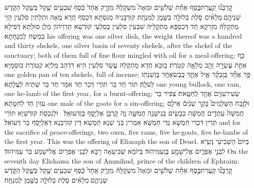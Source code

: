 {קׇרְבָּנ֞וֹ קַֽעֲרַת\maqqaf כֶּ֣סֶף אַחַ֗ת שְׁלֹשִׁ֣ים וּמֵאָה֮ מִשְׁקָלָהּ֒ מִזְרָ֤ק אֶחָד֙ כֶּ֔סֶף שִׁבְעִ֥ים שֶׁ֖קֶל בְּשֶׁ֣קֶל הַקֹּ֑דֶשׁ שְׁנֵיהֶ֣ם \legarmeh  מְלֵאִ֗ים סֹ֛לֶת בְּלוּלָ֥ה בַשֶּׁ֖מֶן לְמִנְחָֽה׃}
{קוּרְבָּנֵיהּ מְגִסְּתָא דִּכְסַף חֲדָא מְאָה וּתְלָתִין סִלְעִין הָוֵי מַתְקָלַהּ מִזְרְקָא חַד דְּכַסְפָּא מַתְקָלֵיהּ שִׁבְעִין סִלְעִין בְּסִלְעֵי קוּדְשָׁא תַּרְוֵיהוֹן מְלַן סוּלְתָּא דְּפִילָא בִמְשַׁח לְמִנְחָתָא׃}
{his offering was one silver dish, the weight thereof was a hundred and thirty shekels, one silver basin of seventy shekels, after the shekel of the sanctuary; both of them full of fine flour mingled with oil for a meal-offering;}{}
{כַּ֥ף אַחַ֛ת עֲשָׂרָ֥ה זָהָ֖ב מְלֵאָ֥ה קְטֹֽרֶת׃}
{בָּזִכָּא חֲדָא מַתְקָלַהּ עֲשַׂר סִלְעִין הִיא דִּדְהַב מַלְיָא קְטוֹרֶת בּוּסְמַיָּא׃}
{one golden pan of ten shekels, full of incense;}{}
{פַּ֣ר אֶחָ֞ד בֶּן\maqqaf בָּקָ֗ר אַ֧יִל אֶחָ֛ד כֶּֽבֶשׂ\maqqaf אֶחָ֥ד בֶּן\maqqaf שְׁנָת֖וֹ לְעֹלָֽה׃}
{תּוֹר חַד בַּר תּוֹרֵי דְּכַר חַד אִמַּר חַד בַּר שַׁתֵּיהּ לַעֲלָתָא׃}
{one young bullock, one ram, one he-lamb of the first year, for a burnt-offering;}{}
{שְׂעִיר\maqqaf עִזִּ֥ים אֶחָ֖ד לְחַטָּֽאת׃}
{צְפִיר בַּר עִזִּין חַד לְחַטָּתָא׃}
{one male of the goats for a sin-offering;}{}
{וּלְזֶ֣בַח הַשְּׁלָמִים֮ בָּקָ֣ר שְׁנַ֒יִם֒ אֵילִ֤ם חֲמִשָּׁה֙ עַתֻּדִ֣ים חֲמִשָּׁ֔ה כְּבָשִׂ֥ים בְּנֵי\maqqaf שָׁנָ֖ה חֲמִשָּׁ֑ה זֶ֛ה קׇרְבַּ֥ן אֶלְיָסָ֖ף בֶּן\maqqaf דְּעוּאֵֽל׃ \petucha }
{וּלְנִכְסַת קוּדְשַׁיָּא תּוֹרֵי תְּרֵין דִּכְרֵי חַמְשָׁא גְּדֵי חַמְשָׁא אִמְּרִין בְּנֵי שְׁנָא חַמְשָׁא דֵּין קוּרְבָּנָא דְּאֶלְיָסָף בַּר דְּעוּאֵל׃}
{and for the sacrifice of peace-offerings, two oxen, five rams, five he-goats, five he-lambs of the first year. This was the offering of Eliasaph the son of Deuel.}{}
{בַּיּוֹם֙ הַשְּׁבִיעִ֔י נָשִׂ֖יא לִבְנֵ֣י אֶפְרָ֑יִם אֱלִֽישָׁמָ֖ע בֶּן\maqqaf עַמִּיהֽוּד׃}
{בְּיוֹמָא שְׁבִיעָאָה רַבָּא לִבְנֵי אֶפְרָיִם אֱלִישָׁמָע בַּר עַמִּיהוּד׃}
{On the seventh day Elishama the son of Ammihud, prince of the children of Ephraim:}{}
{קׇרְבָּנ֞וֹ קַֽעֲרַת\maqqaf כֶּ֣סֶף אַחַ֗ת שְׁלֹשִׁ֣ים וּמֵאָה֮ מִשְׁקָלָהּ֒ מִזְרָ֤ק אֶחָד֙ כֶּ֔סֶף שִׁבְעִ֥ים שֶׁ֖קֶל בְּשֶׁ֣קֶל הַקֹּ֑דֶשׁ שְׁנֵיהֶ֣ם \legarmeh  מְלֵאִ֗ים סֹ֛לֶת בְּלוּלָ֥ה בַשֶּׁ֖מֶן לְמִנְחָֽה׃}
